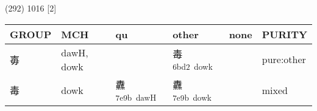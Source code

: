 \documentclass[14pt,a4paper]{scrartcl}
\begin{document}
(292) 1016 {[}2{]}

\begin{longtable}[c]{@{}llllll@{}}
\toprule
\begin{minipage}[b]{0.14\columnwidth}\raggedright\strut
GROUP
\strut\end{minipage} &
\begin{minipage}[b]{0.14\columnwidth}\raggedright\strut
MCH
\strut\end{minipage} &
\begin{minipage}[b]{0.14\columnwidth}\raggedright\strut
qu
\strut\end{minipage} &
\begin{minipage}[b]{0.14\columnwidth}\raggedright\strut
other
\strut\end{minipage} &
\begin{minipage}[b]{0.14\columnwidth}\raggedright\strut
none
\strut\end{minipage} &
\begin{minipage}[b]{0.14\columnwidth}\raggedright\strut
PURITY
\strut\end{minipage}\tabularnewline
\midrule
\endhead
\begin{minipage}[t]{0.14\columnwidth}\raggedright\strut
毐
\strut\end{minipage} &
\begin{minipage}[t]{0.14\columnwidth}\raggedright\strut
dawH, dowk
\strut\end{minipage} &
\begin{minipage}[t]{0.14\columnwidth}\raggedright\strut
\strut\end{minipage} &
\begin{minipage}[t]{0.14\columnwidth}\raggedright\strut
毒\textsuperscript{6bd2~dowk}
\strut\end{minipage} &
\begin{minipage}[t]{0.14\columnwidth}\raggedright\strut
\strut\end{minipage} &
\begin{minipage}[t]{0.14\columnwidth}\raggedright\strut
pure:other
\strut\end{minipage}\tabularnewline
\begin{minipage}[t]{0.14\columnwidth}\raggedright\strut
毒
\strut\end{minipage} &
\begin{minipage}[t]{0.14\columnwidth}\raggedright\strut
dowk
\strut\end{minipage} &
\begin{minipage}[t]{0.14\columnwidth}\raggedright\strut
纛\textsuperscript{7e9b~dawH}
\strut\end{minipage} &
\begin{minipage}[t]{0.14\columnwidth}\raggedright\strut
纛\textsuperscript{7e9b~dowk}
\strut\end{minipage} &
\begin{minipage}[t]{0.14\columnwidth}\raggedright\strut
\strut\end{minipage} &
\begin{minipage}[t]{0.14\columnwidth}\raggedright\strut
mixed
\strut\end{minipage}\tabularnewline
\bottomrule
\end{longtable}
\end{document}
